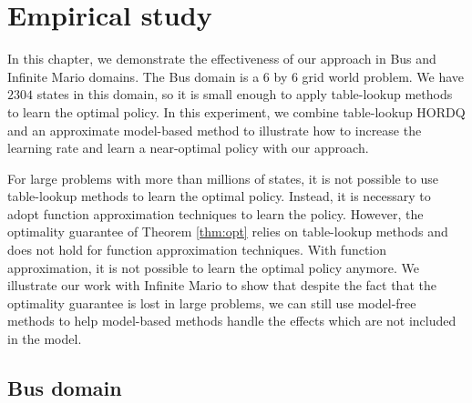 
\chapter{Empirical study}

In this chapter, we demonstrate the effectiveness of our approach in
Bus and Infinite Mario domains.
The Bus domain is a 6 by 6 grid world problem. 
We have $2304$ states in this domain, so it is small enough to apply table-lookup methods to learn
the optimal policy. In this experiment, we combine table-lookup HORDQ and an approximate model-based method 
to illustrate how to increase the learning rate and learn a near-optimal policy with our approach.

For large problems with more than millions of states, it is not possible to use table-lookup methods to learn the optimal policy.
Instead, it is necessary to adopt function approximation techniques to learn the policy.
However, the optimality guarantee of Theorem \ref{thm:opt} relies on table-lookup methods and 
does not hold for function approximation techniques.
With function approximation, it is not possible to learn the optimal policy anymore.
We illustrate our work with Infinite Mario to show that despite the fact that the optimality guarantee is lost in
large problems, we can still use model-free methods to help model-based methods handle the effects which
are not included in the model. 



\section{Bus domain}
\label{se:domain}

